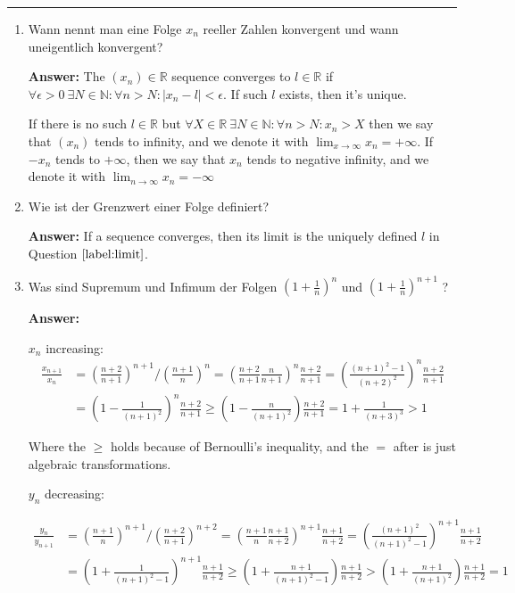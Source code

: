 \documentclass[11pt]{article}
\newcommand{\abs}[1]{\left|#1\right|}
\newcommand{\RR}[0]{\mathbb{R}}
\newcommand{\NN}[0]{\mathbb{N}}
\begin{document}


\medskip\hrule
\begin{enumerate}
    \item \label{label:limit} Wann nennt man eine Folge $x_n$ reeller Zahlen konvergent und wann uneigentlich konvergent?

    \textbf{Answer:} The $(x_n) \in \RR$ sequence converges to $l \in \RR$ if $\forall \epsilon >0~\exists N \in \NN\colon \forall n > N\colon \abs{x_n - l} < \epsilon$. If such $l$ exists, then it's unique.

    If there is no such $l \in \RR$ but $\forall X \in \RR~\exists N \in \NN\colon \forall n > N\colon x_n > X$ then we say that $(x_n)$ tends to infinity, and we denote it with $\lim_{x\to\infty} x_n = +\infty$. If $-x_n$ tends to $+\infty$, then we say that $x_n$ tends to negative infinity, and we denote it with $\lim_{n\to\infty}x_n = -\infty$

    \item Wie ist der Grenzwert einer Folge definiert?

    \textbf{Answer:} If a sequence converges, then its limit is the uniquely defined $l$ in Question $\ref{label:limit}$.


    \item \label{label:e} Was sind Supremum und Infimum der Folgen $(1 + \frac{1}{n})^n$ und $(1 + \frac{1}{n} )^{n+1}$ ?

    \textbf{Answer:}

    $x_n$ increasing:
    $$\begin{aligned}\frac{x_{n+1}}{x_n} &= \left(\frac{n+2}{n+1}\right)^{n+1} / \left(\frac{n+1}{n}\right)^n = \left(\frac{n+2}{n+1}\frac{n}{n+1}\right)^n\frac{n+2}{n+1} = \left(\frac{(n+1)^2 -1}{(n+2)^2}\right)^n\frac{n+2}{n+1} \\&= \left(1 - \frac{1}{(n+1)^2}\right)^n \frac{n+2}{n+1} \ge \left(1 -\frac{n}{(n+1)^2}\right)\frac{n+2}{n+1} = 1 + \frac{1}{(n+3)^3} > 1\end{aligned}$$

    Where the $\ge$ holds because of Bernoulli's inequality, and the $=$ after is just algebraic transformations.

    $y_n$ decreasing:

    $$\begin{aligned}
        \frac{y_n}{y_{n+1}} &= \left(\frac{n+1}{n}\right)^{n+1} / \left(\frac{n+2}{n+1}\right)^{n+2} = \left(\frac{n+1}{n}\frac{n+1}{n+2}\right)^{n+1} \frac{n+1}{n+2} = \left(\frac{(n+1)^2}{(n+1)^2 -1}\right)^{n+1} \frac{n+1}{n+2} \\
        &= \left(1+\frac{1}{(n+1)^2 -1}\right)^{n+1} \frac{n+1}{n+2} \ge \left(1 + \frac{n+1}{(n+1)^2 - 1}\right) \frac{n+1}{n+2} > \left(1 + \frac{n+1}{(n+1)^2}\right)\frac{n+1}{n+2} = 1
    \end{aligned}$$


\end{enumerate}
\end{document}
